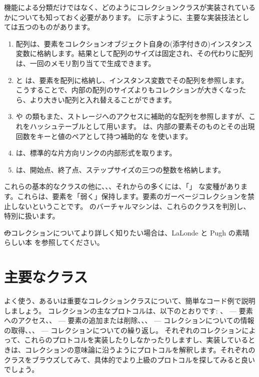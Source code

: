 \documentclass[a4paper,10pt,twoside]{book}
\begin{document}
機能による分類だけではなく、どのようにコレクションクラスが実装されているかについても知っておく必要があります。 に示すように、主要な実装技法としては五つのものがあります。

\begin{enumerate}
  \item 配列は、要素をコレクションオブジェクト自身の(添字付きの)インスタンス変数に格納します。結果として配列のサイズは固定され、その代わりに配列は、一回のメモリ割り当てで生成できます。
  \item {} と  は、要素を配列に格納し、インスタンス変数でその配列を参照します。
  こうすることで、内部の配列のサイズよりもコレクションが大きくなったら、より大きい配列と入れ替えることができます。
  \item {} や  の類もまた、ストレージへのアクセスに補助的な配列を参照しますが、これをハッシュテーブルとして用います。 は、内部の要素そのものとその出現回数をキーと値のペアとして持つ補助的な  を使います。
  \item {} は、標準的な片方向リンクの内部形式を取ります。
  \item {} は、開始点、終了点、ステップサイズの三つの整数を格納します。
\end{enumerate}
これらの基本的なクラスの他に、、、それからの多くには、「」 な変種があります。これらは、要素を「弱く」保持します。\ie 要素のガーベージコレクションを禁止しないということです。
\pharo のバーチャルマシンは、これらのクラスを判別し、特別に扱います。

\st のコレクションについてより詳しく知りたい場合は、LaLonde と Pugh の素晴らしい本\cite{LaLo90a} を参照してください。

\section{主要なクラス}
よく使う、あるいは重要なコレクションクラスについて、簡単なコード例で説明しましょう。
コレクションの主なプロトコルは、以下のとおりです: 、 --- 要素へのアクセス、、 --- 要素の追加または削除、、、 --- コレクションについての情報の取得、、、 --- コレクションについての繰り返し。
それぞれのコレクションによって、これらのプロトコルを実装したりしなかったりしますし、実装しているときは、コレクションの意味論に沿うようにプロトコルを解釈します。それぞれのクラスをブラウズしてみて、具体的でより上級のプロトコルを探してみると良いでしょう。
\end{document}
